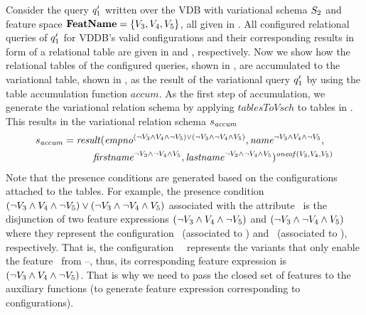 

\begin{example}
\label{eg:acc-table-from-conf}
Consider the query $\VVal {\vQ_1}$ written over the VDB with variational schema $\vSch_2$ and 
feature space $\fSet = \setDef {\vThree, \vFour, \vFive}$, all given in . 
%
All configured relational queries of $\VVal {\vQ_1}$ for VDDB's valid configurations and their
corresponding results in form of a relational table are given
in  and , respectively. 
%
Now we show how the relational tables of the configured queries, shown in , are accumulated 
to the variational table, shown in , as the result of the variational query $\VVal \vQ_1$ by 
using the table accumulation function $\mathit{accum}$.
%
As the first step of accumulation, we generate the variational relation schema by
applying $\mathit{tablesToVsch}$ to tables in . 
This results in the variational relation schema $\vRelSch_{\mathit{accum}}$
%
\begin{alignat*}{1}
\vRelSch_{\mathit{accum}} &= \mathit{result} (\annot [(\neg \vThree \wedge \vFour \wedge \neg \vFive)\vee(\neg \vThree \wedge \neg \vFour \wedge \vFive)] \empno, \annot [\neg \vThree \wedge \vFour \wedge \neg \vFive] \name,\\
&\hspace{30pt}\annot [\neg \vThree \wedge \neg \vFour \wedge \vFive] \fname, \annot [\neg \vThree \wedge \neg \vFour \wedge \vFive] \lname)^{\oneof {\vThree,\vFour,\vFive}}
\end{alignat*}
%
\noindent
Note that the presence conditions are generated based on the configurations attached to
the tables. For example, the presence condition $(\neg \vThree \wedge \vFour \wedge \neg \vFive)\vee(\neg \vThree \wedge \neg \vFour \wedge \vFive)$ associated with the attribute \empno\
is the disjunction of  two feature expressions $(\neg \vThree \wedge \vFour \wedge \neg \vFive)$
and $(\neg \vThree \wedge \neg \vFour \wedge \vFive)$ where they represent the configuration
\setDef \vFour\ (associated to \tabref{vq-conf2}) and \setDef \vFive\ (associated to ),
respectively. That is, the configuration \setDef\ \vFour\ represents the variants that only enable the
feature \vFour\ from \vThree--\vFive, thus, its corresponding feature expression is $(\neg \vThree \wedge \vFour \wedge \neg \vFive)$. That is why we need to pass the closed set of features 
to the auxiliary functions (to generate feature expression corresponding to configurations).


\end{example}
